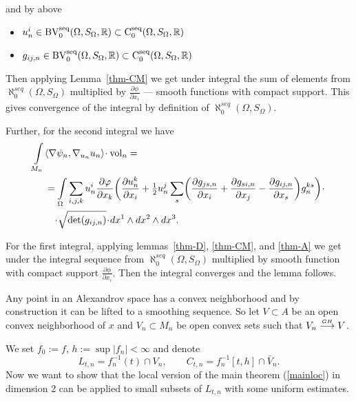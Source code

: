  and by above
 
  \begin{itemize}
  
  \item ${u^i_n}\in  \operatorname{BV_0^{seq}}(\Omega,S_\Omega,\mathbb{R})\subset\operatorname{C_0^{seq}}(\Omega,S_\Omega,\mathbb{R})$ 
 
 \item $g_{i j,n}\in   \operatorname{BV_0^{seq}}(\Omega,S_\Omega,\mathbb{R})\subset \operatorname{C_0^{seq}}(\Omega,S_\Omega,\mathbb{R})$
 
  \end{itemize}
  
Then applying Lemma~\ref{thm-CM} we get under integral the sum of elements from $\aleph_0^{seq}(\Omega,S_\Omega)$ multiplied by $\frac{\partial \phi}{\partial x_i}$ --- smooth functions with compact support.
This gives convergence of the integral by definition of  $\aleph_0^{seq}(\Omega,S_\Omega)$.
              

Further, for the second integral %
we have
\begin{align*}
\int\limits_{M_n}&\<\nabla\psi_n,\nabla_{u_n} u_n\>\cdot\vol_n=\\
&=\int\limits_{\Omega}  \sum_{i,j,k}u^i_n \frac{\partial \phi}{\partial x_k}
\biggl(\frac{\partial u^k_n}{\partial x_i} +\tfrac{1}{2}u^j_n\sum_s
\biggl(\frac{\partial g_{ js,n}}{\partial x_i}+\frac{\partial g_{si,n}}{\partial x_j}-\frac{\partial g_{i j,n}}{\partial x_s}\biggr) g^{ks}_n\biggr)\cdot 
\\
&\quad\cdot\sqrt{\op{det}(g_{i j,n})}\cdot dx^1\wedge dx^2\wedge dx^3.
\end{align*}


For the first integral,
 applying
lemmas~\ref{thm-D}, \ref{thm-CM}, and \ref{thm-A} we get under the integral sequence from $\aleph_0^{seq}(\Omega,S_\Omega)$ multiplied by smooth function with compact support $\frac{\partial \phi}{\partial x_i}$. Then the integral converges and the lemma follows.
\qeds


Any point  in an Alexandrov space
has a convex neighborhood \cite{petrunin-conc} and by
construction  it can be lifted  to a smoothing sequence.
So let 
$V\subset A$ be an open  convex
neighborhood of $x$ and
$ V_n\subset M_n$
be open convex sets such that
$V_n  \stackrel{\hbox{\tiny $GH$}}{\longrightarrow}   V$.

We set $f_0:=f$, $h:=\sup |f_n|<\infty$
and denote 
$$L_{t,n}=f_n^{-1}(t)\cap V_n,\qquad
C_{t,n}=f_n^{-1}[t,h]\cap \bar V_n.$$
Now we want to show that the local version of the main theorem (\ref{mainloc}) in dimension 2 can be applied to small subsets of $L_{t,n}$ with some uniform estimates.

